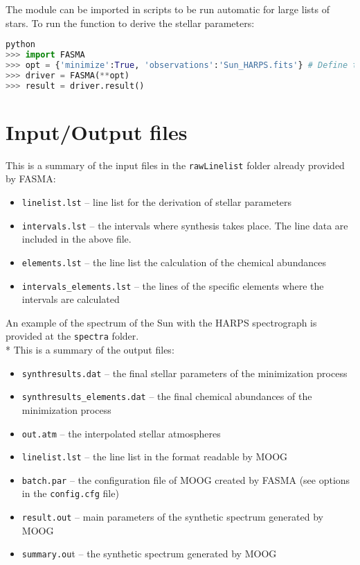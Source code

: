 \documentclass[a4paper,12pt]{article}
\begin{document}
The module can be imported in scripts to be run automatic for large lists of stars. To run the function to derive the stellar parameters:
{\footnotesize
\begin{lstlisting}[language=Python]
python
>>> import FASMA
>>> opt = {'minimize':True, 'observations':'Sun_HARPS.fits'} # Define the options here
>>> driver = FASMA(**opt)
>>> result = driver.result()
\end{lstlisting}}

\section{Input/Output files}

This is a summary of the input files in the \texttt{rawLinelist} folder already provided by FASMA:
\begin{itemize}
 \item \texttt{linelist.lst} -- line list for the derivation of stellar parameters
 \item \texttt{intervals.lst} -- the intervals where synthesis takes place. The line data are included in the above file. 
 \item \texttt{elements.lst} -- the line list the calculation of the chemical abundances
 \item \texttt{intervals\_elements.lst} -- the lines of the specific elements where the intervals are calculated 
\end{itemize}

An example of the spectrum of the Sun with the HARPS spectrograph is provided at the \texttt{spectra} folder.
\\*
This is a summary of the output files:
\begin{itemize}
 \item \texttt{synthresults.dat} -- the final stellar parameters of the minimization process 
 \item \texttt{synthresults\_elements.dat} -- the final chemical abundances of the minimization process 
 \item \texttt{out.atm} -- the interpolated stellar atmospheres 
 \item \texttt{linelist.lst} -- the line list in the format readable by MOOG
 \item \texttt{batch.par} -- the configuration file of MOOG created by FASMA (see options in the \texttt{config.cfg} file)
 \item \texttt{result.out} -- main parameters of the synthetic spectrum generated by MOOG
 \item \texttt{summary.ou}t -- the synthetic spectrum generated by MOOG
\end{itemize}
\end{document}
